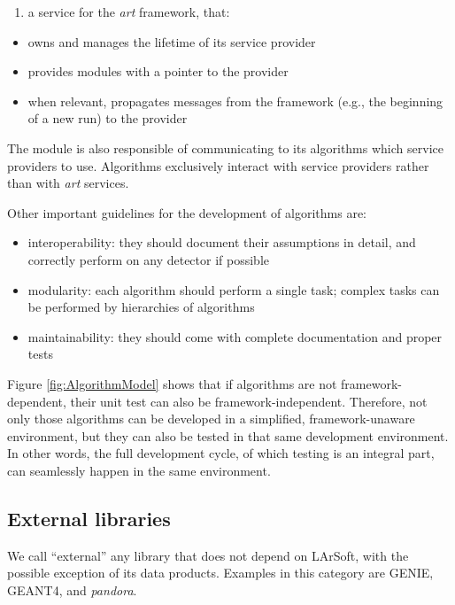 \begin{enumerate}
\def\labelenumi{\arabic{enumi}.}
\setcounter{enumi}{1}
\item
  a service for the \emph{art} framework, that:
\end{enumerate}

\begin{itemize}
\item
  owns and manages the lifetime of its service provider
\item
  provides modules with a pointer to the provider
\item
  when relevant, propagates messages from the framework (e.g., the
  beginning of a new run) to the provider
\end{itemize}

The module is also responsible of communicating to its algorithms which
service providers to use. Algorithms exclusively interact with service
providers rather than with \emph{art} services.

Other important guidelines for the development of algorithms are:

\begin{itemize}
\item
  interoperability: they should document their assumptions in detail,
  and correctly perform on any detector if possible
\item
  modularity: each algorithm should perform a single task; complex tasks
  can be performed by hierarchies of algorithms
\item
  maintainability: they should come with complete documentation and
  proper tests
\end{itemize}

Figure \ref{fig:AlgorithmModel} shows that if algorithms are not
framework-dependent, their unit test can also be framework-independent.
Therefore, not only those algorithms can be developed in a simplified,
framework-unaware environment, but they can also be tested in that same
development environment. In other words, the full development cycle, of
which testing is an integral part, can seamlessly happen in the same
environment.

\subsection{External libraries}\label{external-libraries}

We call ``external'' any library that does not depend on LArSoft, with
the possible exception of its data products. Examples in this category
are GENIE, GEANT4, and \emph{pandora}.

